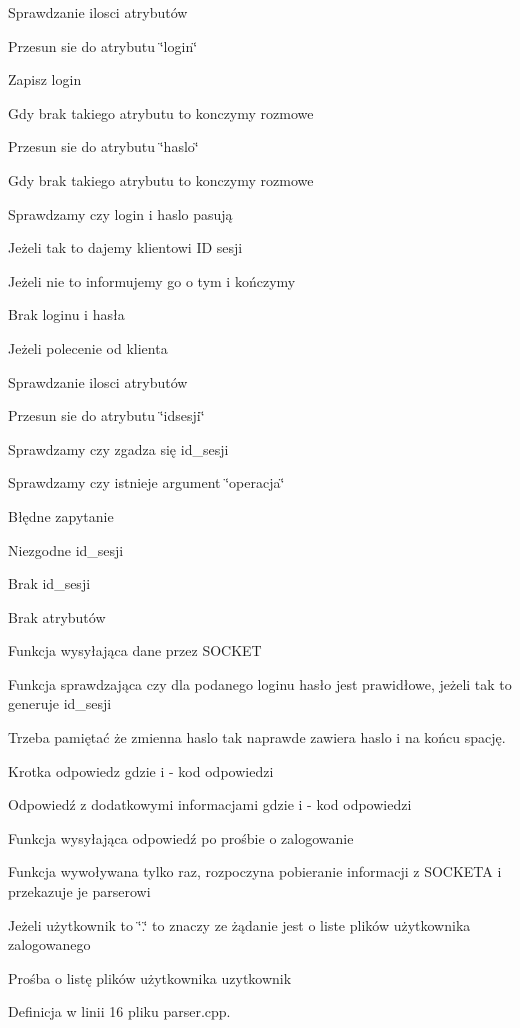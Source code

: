 Sprawdzanie ilosci atrybutów

Przesun sie do atrybutu \char`\"{}login\char`\"{}

Zapisz login

Gdy brak takiego atrybutu to konczymy rozmowe

Przesun sie do atrybutu \char`\"{}haslo\char`\"{}

Gdy brak takiego atrybutu to konczymy rozmowe

Sprawdzamy czy login i haslo pasują

Jeżeli tak to dajemy klientowi ID sesji

Jeżeli nie to informujemy go o tym i kończymy

Brak loginu i hasła

Jeżeli polecenie od klienta

Sprawdzanie ilosci atrybutów

Przesun sie do atrybutu \char`\"{}idsesji\char`\"{}

Sprawdzamy czy zgadza się id\_\-sesji

Sprawdzamy czy istnieje argument \char`\"{}operacja\char`\"{}

Błędne zapytanie

Niezgodne id\_\-sesji

Brak id\_\-sesji

Brak atrybutów

Funkcja wysyłająca dane przez SOCKET

Funkcja sprawdzająca czy dla podanego loginu hasło jest prawidłowe, jeżeli tak to generuje id\_\-sesji

Trzeba pamiętać że zmienna haslo tak naprawde zawiera haslo i na końcu spację.

Krotka odpowiedz gdzie i - kod odpowiedzi

Odpowiedź z dodatkowymi informacjami gdzie i - kod odpowiedzi

Funkcja wysyłająca odpowiedź po prośbie o zalogowanie

Funkcja wywoływana tylko raz, rozpoczyna pobieranie informacji z SOCKETA i przekazuje je parserowi

Jeżeli użytkownik to \char`\"{}.\char`\"{} to znaczy ze żądanie jest o liste plików użytkownika zalogowanego

Prośba o listę plików użytkownika uzytkownik 

Definicja w linii 16 pliku parser.cpp.


